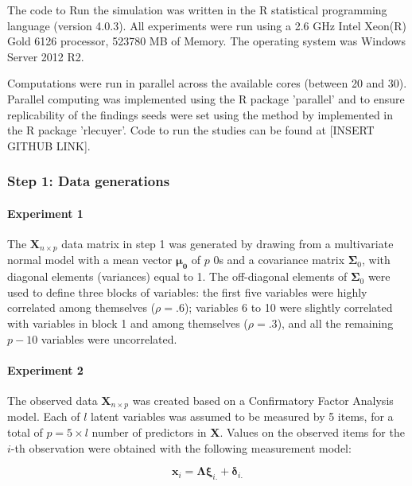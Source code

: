 	The code to Run the simulation was written in the R statistical programming language (version 4.0.3). 
	All experiments were run using a 2.6 GHz Intel Xeon(R) Gold 6126 processor, 523780 MB of Memory. The
	operating system was Windows Server 2012 R2.

	Computations were run in parallel across the available cores (between 20 and 30). Parallel computing 
	was implemented using the R package 'parallel' and to ensure replicability of the findings seeds were
	set using the method by \cite{lecuyer:2002} implemented in the R package 'rlecuyer'.
	Code to run the studies can be found at [INSERT GITHUB LINK].


\subsubsection{Step 1: Data generations}

	\paragraph{Experiment 1} 
	The $\bm{X}_{n \times p}$ data matrix in step 1 was generated by drawing from a multivariate normal 
	model with a mean vector $\bm{\mu_0}$ of $p$ 0s and a covariance matrix $\bm{\Sigma}_0$, with diagonal 
	elements (variances) equal to 1. 
	The off-diagonal elements of $\bm{\Sigma}_0$ were used to define three blocks of variables: 
	the first five variables were highly correlated among themselves ($\rho = .6$); 
	variables 6 to 10 were slightly correlated with variables in block 1 and among themselves ($\rho = .3$), 
	and all the remaining $p-10$ variables were uncorrelated.

	\paragraph{Experiment 2}
	The observed data $\bm{X}_{n \times p}$ was created based on a Confirmatory Factor Analysis model.
	Each of $l$ latent variables was assumed to be measured by 5 items, for a total of $p = 5 \times l$ 
	number of predictors in $\bm{X}$.
	Values on the observed items for the $i$-th observation were obtained with the following measurement 
	model:

	\begin{equation}
		\bm{x}_i = \bm{\Lambda} \bm{\xi}_{i.} + \bm{\delta}_{i.}
	\end{equation}

